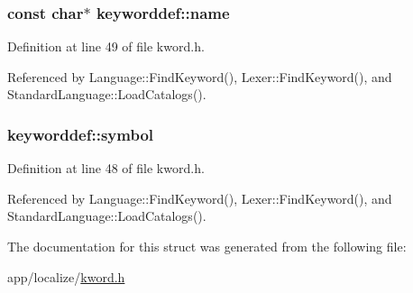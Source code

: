 \subsubsection[{\texorpdfstring{name}{name}}]{\setlength{\rightskip}{0pt plus 5cm}const char$\ast$ keyworddef\+::name}\hypertarget{structkeyworddef_a03b3d7dd316565c6fac8786186ec66c2}{}\label{structkeyworddef_a03b3d7dd316565c6fac8786186ec66c2}


Definition at line 49 of file kword.\+h.



Referenced by Language\+::\+Find\+Keyword(), Lexer\+::\+Find\+Keyword(), and Standard\+Language\+::\+Load\+Catalogs().

\subsubsection[{\texorpdfstring{symbol}{symbol}}]{ keyworddef\+::symbol}\hypertarget{structkeyworddef_aec6598e221bbce9e131b30989f7e2cce}{}\label{structkeyworddef_aec6598e221bbce9e131b30989f7e2cce}


Definition at line 48 of file kword.\+h.



Referenced by Language\+::\+Find\+Keyword(), Lexer\+::\+Find\+Keyword(), and Standard\+Language\+::\+Load\+Catalogs().



The documentation for this struct was generated from the following file\+:\begin{DoxyCompactItemize}
\item 
app/localize/\hyperlink{kword_8h}{kword.\+h}\end{DoxyCompactItemize}
